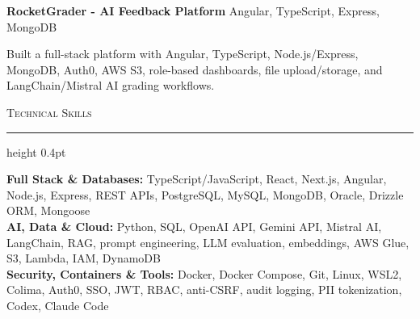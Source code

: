 \documentclass[letterpaper,11pt]{article}
\newcommand{\resumesection}[1]{%
  \par\vspace{2pt}%
  {\large\scshape #1}\par\vspace{2pt}%
  \hrule height 0.4pt\vspace{2pt}%
}
\newcommand{\projectHeading}[2]{
  \textbf{#1} \hfill #2
}
\begin{document}
\projectHeading{RocketGrader - AI Feedback Platform}{Angular, TypeScript, Express, MongoDB}
\begin{tightitemize}
  \item Built a full-stack platform with Angular, TypeScript, Node.js/Express, MongoDB, Auth0, AWS S3, role-based dashboards, file upload/storage, and LangChain/Mistral AI grading workflows.
\end{tightitemize}

\resumesection{Technical Skills}
\textbf{Full Stack \& Databases:} TypeScript/JavaScript, React, Next.js, Angular, Node.js, Express, REST APIs, PostgreSQL, MySQL, MongoDB, Oracle, Drizzle ORM, Mongoose\\
\textbf{AI, Data \& Cloud:} Python, SQL, OpenAI API, Gemini API, Mistral AI, LangChain, RAG, prompt engineering, LLM evaluation, embeddings, AWS Glue, S3, Lambda, IAM, DynamoDB\\
\textbf{Security, Containers \& Tools:} Docker, Docker Compose, Git, Linux, WSL2, Colima, Auth0, SSO, JWT, RBAC, anti-CSRF, audit logging, PII tokenization, Codex, Claude Code
\end{document}
